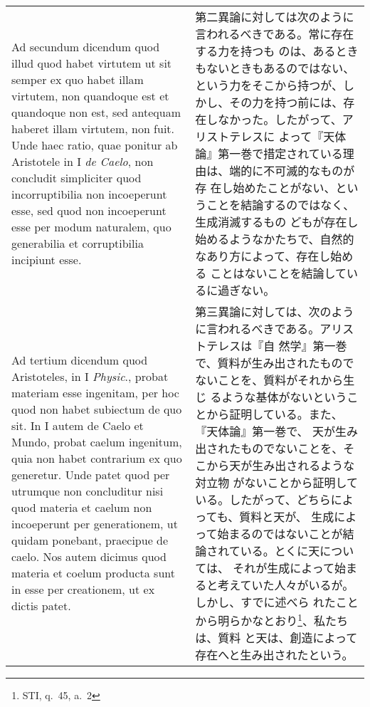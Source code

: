 \documentclass[10pt]{jsarticle} %
\begin{document}
\begin{longtable}{p{21em}p{21em}}
\\



{\sc Ad secundum dicendum} quod illud quod habet virtutem ut sit semper ex quo
 habet illam virtutem, non quandoque est et quandoque non est, sed
 antequam haberet illam virtutem, non fuit. Unde haec ratio, quae
 ponitur ab Aristotele in I {\it de Caelo}, non concludit simpliciter quod
 incorruptibilia non incoeperunt esse, sed quod non incoeperunt esse per
 modum naturalem, quo generabilia et corruptibilia incipiunt esse.

&

第二異論に対しては次のように言われるべきである。常に存在する力を持つも
のは、あるときもないときもあるのではない、という力をそこから持つが、し
かし、その力を持つ前には、存在しなかった。したがって、アリストテレスに
よって『天体論』第一巻で措定されている理由は、端的に不可滅的なものが存
在し始めたことがない、ということを結論するのではなく、生成消滅するもの
どもが存在し始めるようなかたちで、自然的なあり方によって、存在し始める
ことはないことを結論しているに過ぎない。



\\



{\sc Ad tertium dicendum} quod Aristoteles, in I {\it Physic}., probat materiam esse
 ingenitam, per hoc quod non habet subiectum de quo sit. In I autem {de
 Caelo et Mundo}, probat caelum ingenitum, quia non habet contrarium ex
 quo generetur. Unde patet quod per utrumque non concluditur nisi quod
 materia et caelum non incoeperunt per generationem, ut quidam ponebant,
 praecipue de caelo. Nos autem dicimus quod materia et coelum producta
 sunt in esse per creationem, ut ex dictis patet.

&

第三異論に対しては、次のように言われるべきである。アリストテレスは『自
然学』第一巻で、質料が生み出されたものでないことを、質料がそれから生じ
るような基体がないということから証明している。また、『天体論』第一巻で、
天が生み出されたものでないことを、そこから天が生み出されるような対立物
がないことから証明している。したがって、どちらによっても、質料と天が、
生成によって始まるのではないことが結論されている。とくに天については、
それが生成によって始まると考えていた人々がいるが。しかし、すでに述べら
れたことから明らかなとおり\footnote{STI, q.~45, a.~2}、私たちは、質料
と天は、創造によって存在へと生み出されたという。


\\




\end{longtable}
\end{document}
